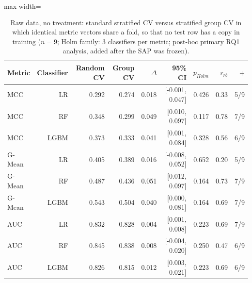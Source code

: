 \begin{table}[t]
\centering
\footnotesize
\caption{Raw data, no treatment: standard stratified CV versus stratified group CV in which identical metric vectors share a fold, so that no test row has a copy in training ($n=9$; Holm family: 3 classifiers per metric; post-hoc primary RQ1 analysis, added after the SAP was frozen).}
\label{tab:groupcv}
\begin{adjustbox}{max width=\linewidth}
\begin{tabular}{lrrrrrrrr}
\toprule
Metric & Classifier & Random CV & Group CV & $\Delta$ & 95\% CI & $p_{Holm}$ & $r_{rb}$ & $+$ \\
\midrule
MCC & LR & 0.292 & 0.274 & 0.018 & [-0.001, 0.047] & 0.426 & 0.33 & 5/9 \\
MCC & RF & 0.348 & 0.299 & 0.049 & [0.010, 0.097] & 0.117 & 0.78 & 7/9 \\
MCC & LGBM & 0.373 & 0.333 & 0.041 & [0.001, 0.084] & 0.328 & 0.56 & 6/9 \\
G-Mean & LR & 0.405 & 0.389 & 0.016 & [-0.008, 0.052] & 0.652 & 0.20 & 5/9 \\
G-Mean & RF & 0.487 & 0.436 & 0.051 & [0.012, 0.097] & 0.164 & 0.73 & 7/9 \\
G-Mean & LGBM & 0.543 & 0.504 & 0.040 & [0.000, 0.081] & 0.164 & 0.69 & 7/9 \\
AUC & LR & 0.832 & 0.828 & 0.004 & [0.001, 0.008] & 0.223 & 0.69 & 7/9 \\
AUC & RF & 0.845 & 0.838 & 0.008 & [-0.004, 0.020] & 0.250 & 0.47 & 6/9 \\
AUC & LGBM & 0.826 & 0.815 & 0.012 & [0.003, 0.021] & 0.223 & 0.69 & 6/9 \\
\bottomrule
\end{tabular}
\end{adjustbox}
\end{table}

